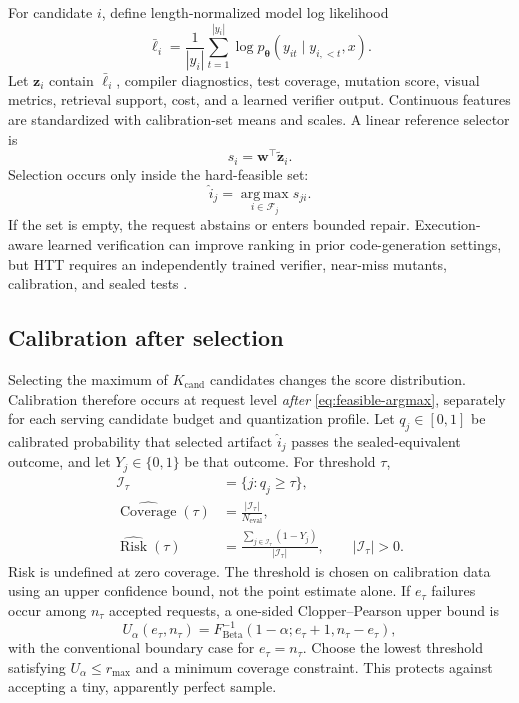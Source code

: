 \documentclass[10pt,letterpaper]{article}
\newcommand{\1}{\mathbb{1}}
\newcommand{\vect}[1]{\bm{#1}}
\newcommand{\argmax}{\operatorname*{arg\,max}}
\newcommand{\Risk}{\operatorname{Risk}}
\newcommand{\Coverage}{\operatorname{Coverage}}
\begin{document}
For candidate $i$, define length-normalized model log likelihood
\begin{equation}
  \bar\ell_i=\frac{1}{|y_i|}\sum_{t=1}^{|y_i|}
  \log p_{\vect\theta}(y_{it}\mid y_{i,<t},x).
  \label{eq:length-normalized-logp}
\end{equation}
Let $\vect z_i$ contain $\bar\ell_i$, compiler diagnostics, test coverage, mutation score, visual
metrics, retrieval support, cost, and a learned verifier output.  Continuous features are standardized
with calibration-set means and scales.  A linear reference selector is
\begin{equation}
  s_i=\vect w^\top\widetilde{\vect z}_i.
  \label{eq:candidate-score}
\end{equation}
Selection occurs only inside the hard-feasible set:
\begin{equation}
  \widehat i_j=\argmax_{i\in\mathcal F_j}s_{ji}.
  \label{eq:feasible-argmax}
\end{equation}
If the set is empty, the request abstains or enters bounded repair.  Execution-aware learned
verification can improve ranking in prior code-generation settings, but HTT requires an independently
trained verifier, near-miss mutants, calibration, and sealed tests \cite{ni2023lever,cobbe2021verifiers}.

\subsection{Calibration after selection}

Selecting the maximum of $K_{\mathrm{cand}}$ candidates changes the score distribution.  Calibration
therefore occurs at request level \emph{after} \cref{eq:feasible-argmax}, separately for each serving
candidate budget and quantization profile.  Let $q_j\in[0,1]$ be calibrated probability that selected
artifact $\widehat i_j$ passes the sealed-equivalent outcome, and let $Y_j\in\{0,1\}$ be that outcome.
For threshold $\tau$,
\begin{align}
  \mathcal I_\tau&=\{j:q_j\ge\tau\},\\
  \widehat{\Coverage}(\tau)
  &=\frac{|\mathcal I_\tau|}{N_{\mathrm{eval}}},\\
  \widehat{\Risk}(\tau)
  &=\frac{\sum_{j\in\mathcal I_\tau}(1-Y_j)}{|\mathcal I_\tau|},
  \qquad |\mathcal I_\tau|>0.
  \label{eq:risk-coverage}
\end{align}
Risk is undefined at zero coverage.  The threshold is chosen on calibration data using an upper
confidence bound, not the point estimate alone.  If $e_\tau$ failures occur among $n_\tau$ accepted
requests, a one-sided Clopper--Pearson upper bound is
\begin{equation}
  U_\alpha(e_\tau,n_\tau)
  =F^{-1}_{\mathrm{Beta}}(1-\alpha;e_\tau+1,n_\tau-e_\tau),
  \label{eq:cp-upper}
\end{equation}
with the conventional boundary case for $e_\tau=n_\tau$.  Choose the lowest threshold satisfying
$U_\alpha\le r_{\max}$ and a minimum coverage constraint.  This protects against accepting a tiny,
apparently perfect sample.
\end{document}
